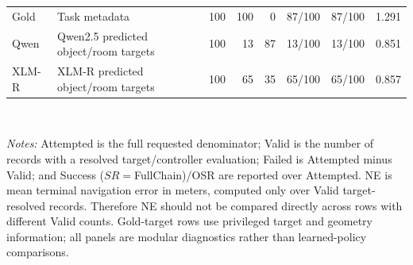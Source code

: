 \begin{table}[pos=t]
\begin{tabular}{@{}p{2.7cm}p{4.3cm}rrrrrr@{}}
\hline
Gold & Task metadata & 100 & 100 & 0 & 87/100 & 87/100 & 1.291 \\
Qwen & Qwen2.5 predicted object/room targets & 100 & 13 & 87 & 13/100 & 13/100 & 0.851 \\
XLM-R & XLM-R predicted object/room targets & 100 & 65 & 35 & 65/100 & 65/100 & 0.857 \\
\hline
\end{tabular}
\\[-1pt]
\parbox{0.98\textwidth}{\small\textit{Notes:} Attempted is the full requested denominator; Valid is the number of records with a resolved target/controller evaluation; Failed is Attempted minus Valid; and Success ($SR{=}$FullChain)/OSR are reported over Attempted. NE is mean terminal navigation error in meters, computed only over Valid target-resolved records. Therefore NE should not be compared directly across rows with different Valid counts. Gold-target rows use privileged target and geometry information; all panels are modular diagnostics rather than learned-policy comparisons.}
\end{table}

